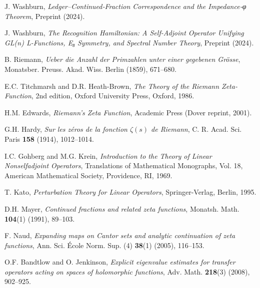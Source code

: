 \documentclass[11pt,a4paper]{article}
\theoremstyle{definition}
\theoremstyle{remark}
\begin{document}
\begin{thebibliography}{99}

J. Washburn,
\emph{Ledger–Continued‑Fraction Correspondence and the Impedance‑φ Theorem},
Preprint (2024).

J. Washburn,
\emph{The Recognition Hamiltonian: A Self-Adjoint Operator Unifying GL(n) L-Functions, E₈ Symmetry, and Spectral Number Theory},
Preprint (2024).

B. Riemann,
\emph{Ueber die Anzahl der Primzahlen unter einer gegebenen Grösse},
Monatsber. Preuss. Akad. Wiss. Berlin (1859), 671--680.

E.C. Titchmarsh and D.R. Heath-Brown,
\emph{The Theory of the Riemann Zeta-Function}, 2nd edition,
Oxford University Press, Oxford, 1986.

H.M. Edwards,
\emph{Riemann's Zeta Function},
Academic Press (Dover reprint, 2001).

G.H. Hardy,
\emph{Sur les zéros de la fonction $\zeta(s)$ de Riemann},
C. R. Acad. Sci. Paris \textbf{158} (1914), 1012--1014.

I.C. Gohberg and M.G. Krein,
\emph{Introduction to the Theory of Linear Nonselfadjoint Operators},
Translations of Mathematical Monographs, Vol. 18,
American Mathematical Society, Providence, RI, 1969.

T. Kato,
\emph{Perturbation Theory for Linear Operators},
Springer-Verlag, Berlin, 1995.

D.H. Mayer,
\emph{Continued fractions and related zeta functions},
Monatsh. Math. \textbf{104}(1) (1991), 89--103.

F. Naud,
\emph{Expanding maps on Cantor sets and analytic continuation of zeta functions},
Ann. Sci. École Norm. Sup. (4) \textbf{38}(1) (2005), 116--153.

O.F. Bandtlow and O. Jenkinson,
\emph{Explicit eigenvalue estimates for transfer operators acting on spaces of holomorphic functions},
Adv. Math. \textbf{218}(3) (2008), 902--925.

\end{thebibliography}
\end{document}
